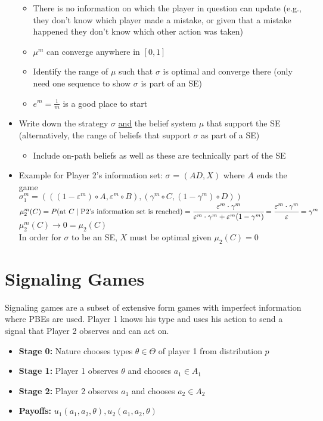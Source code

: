\documentclass{report}
\newcommand{\FlowerSmall}{\mbox{\raisebox{-1pt}{\small\EightFlowerPetalRemoved}}} %
\begin{document}
\begin{mdframed}
\begin{itemize}[label=\FlowerSmall]
			\begin{itemize}
				\item There is no information on which the player in question can update (e.g., they don't know which player made a mistake, or given that a mistake happened they don't know which other action was taken)
				\item $\mu^m$ can converge anywhere in $[0,1]$
				\item Identify the range of $\mu$ such that $\sigma$ is optimal and converge there (only need one sequence to show $\sigma$ is part of an SE)
				\item $e^m = \frac{1}{m}$ is a good place to start
			\end{itemize}
		\item Write down the strategy $\sigma$ \underline{and} the belief system $\mu$ that support the SE \\ (alternatively, the range of beliefs that support $\sigma$ as part of a SE)
			\begin{itemize}
				\item Include on-path beliefs as well as these are technically part of the SE
			\end{itemize}
		\item Example for Player 2's information set: $\sigma$ = $(AD,X)$ where $A$ ends the game\\[10pt] $\sigma_1^m = (((1 - \varepsilon^m) \circ A, \varepsilon^m \circ B),(\gamma^m \circ C, (1 - \gamma^m) \circ D))$\\[5pt]
		$\mu_2^m(C) = P( \text{at $C$} \mid \text{P2's information set is reached}  ) = \cfrac{\varepsilon^m \cdot \gamma^m}{\varepsilon^m \cdot \gamma^m + \varepsilon^m(1 - \gamma^m)} = \cfrac{\varepsilon^m \cdot \gamma^m}{\varepsilon} = \gamma^m$\\[10pt]
		$\mu_2^m(C) \rightarrow 0 = \mu_2(C)$\\[10pt]
		In order for $\sigma$ to be an SE, $X$ must be optimal given $\mu_2(C) = 0$
	\end{itemize}
	\smallskip
\end{mdframed}
\bigskip

\section*{Signaling Games}\medskip

Signaling games are a subset of extensive form games with imperfect information where PBEs are used. Player 1 knows his type and uses his action to send a signal that Player 2 observes and can act on.
\begin{itemize}
	\item \textbf{Stage 0:} Nature chooses types $\theta \in \Theta$ of player 1 from distribution $p$
	\item \textbf{Stage 1:} Player 1 observes $\theta$ and chooses $a_1 \in A_1$
	\item \textbf{Stage 2:} Player 2 observes $a_1$ and chooses $a_2 \in A_2$
	\item \textbf{Payoffs:} $u_1(a_1,a_2,\theta), u_2(a_1,a_2,\theta)$
\end{itemize} \bigskip \bigskip
\end{document}
